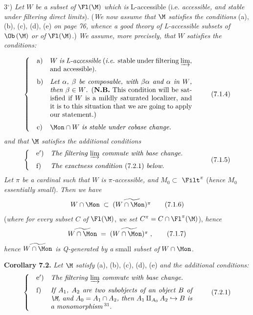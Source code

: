3$^{\circ}$) \textit{Let $W$ be a subset of} $\Fl(\M)$ \textit{which is} L-accessible (i.e. \textit{accessible, and stable under filtering direct limits}). (\textit{We now assume that $\M$ satisfies the conditions} (a), (b), (c), (d), (e) \textit{on page 76, whence a good theory of L-accessible subsets of} $\Ob\,(\M)$ \textit{or of} $\Fl(\M)$.) \textit{We assume, more precisely, that $W$ satisfies the conditions:}

\[
\left\{
\begin{array}{@{\quad}l@{\quad}p{0.6\textwidth}}
\text{a)} & \textit{$W$ is L-accessible} (\textit{i.e.} stable under filtering $\varinjlim$, and accessible). \\[1.5ex]
\text{b)} & \textit{Let $\alpha$, $\beta$ be composable, with $\beta\alpha$ and $\alpha$ in $W$, then $\beta \in W$.} (\textbf{N.B.} This condition will be satisfied if $W$ is a mildly saturated localizer, and it is to this situation that we are going to apply our statement.) \\[1.5ex]
\text{c)} & $\Mon \cap W$ \textit{is stable under cobase change.}
\end{array}
\right.
\tag*{(7.1.4)}
\]
\textit{and that $\M$ satisfies the additional conditions}
\[
\left\{
\begin{array}{@{\quad}l@{\quad}p{0.6\textwidth}}
\text{e$'$)} & \textit{The filtering $\varinjlim$ commute with base change.} \\[1.5ex]
\text{f)} & \textit{The exactness condition} (7.2.1) \textit{below.}
\end{array}
\right.
\tag*{(7.1.5)}
\]
\textit{Let $\pi$ be a cardinal such that $W$ is $\pi$-accessible, and $M_0 \subset$} $\Filt^{\pi}$ (\textit{hence $M_0$ essentially small}). \textit{Then we have}
\[
W \cap \Mon \;\subset\; \widetilde{(W \cap \Mon)^{\pi}}
\tag*{(7.1.6)}
\]
(\textit{where for every subset $C$ of} $\Fl(\M)$, \textit{we set} $C^{\pi} = C \cap \Fl^{\pi}(\M)$), \textit{hence}
\[
\widetilde{W \cap \Mon} \;=\; \widetilde{(W \cap \Mon)^{\pi}} \;,
\tag*{(7.1.7)}
\]
\textit{hence $\widetilde{W \cap \Mon}$ is Q-generated by a} small \textit{subset of} $W \cap \Mon$.

\textbf{Corollary 7.2.} \textit{Let $\M$ satisfy} (a), (b), (c), (d), (e) \textit{and the additional conditions:}
\[
\left\{
\begin{array}{@{\quad}l@{\quad}p{0.6\textwidth}}
\text{e$'$)} & \textit{The filtering $\varinjlim$ commute with base change.} \\[1.5ex]
\text{f)} & \textit{If $A_1$, $A_2$ are two subobjects of an object $B$ of $\M$, and $A_0 = A_1 \cap A_2$, then $A_1 \amalg_{A_0} A_2 \hookrightarrow B$ is a monomorphism}\,\footnotemark[31].
\end{array}
\right.
\tag*{(7.2.1)}
\]

